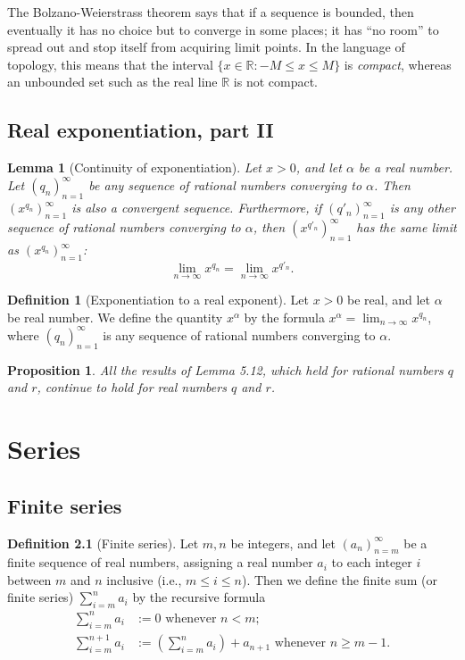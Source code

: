 \documentclass[
]{book}
\newtheorem{lemma}{Lemma}[chapter]
\newtheorem{proposition}{Proposition}[chapter]
\theoremstyle{definition}
\newtheorem{definition}{Definition}[chapter]
\theoremstyle{definition}
\theoremstyle{definition}
\theoremstyle{definition}
\theoremstyle{remark}
\begin{document}
The Bolzano-Weierstrass theorem says that if a sequence is bounded, then eventually it has no choice but to converge in some places; it has ``no room'' to spread out and stop itself from acquiring limit points. In the language of topology, this means that the interval \(\{x\in\mathbb{R}:-M\leq x\leq M\}\) is \emph{compact}, whereas an unbounded set such as the real line \(\mathbb{R}\) is not compact.

\section{Real exponentiation, part II}\label{real-exponentiation-part-ii}

\begin{lemma}[Continuity of exponentiation]
Let \(x>0\), and let \(\alpha\) be a real number. Let \((q_n)_{n=1}^{\infty}\) be any sequence of rational numbers converging to \(\alpha\). Then \((x^{q_n})_{n=1}^{\infty}\) is also a convergent sequence. Furthermore, if \((q'_n)_{n=1}^{\infty}\) is any other sequence of rational numbers converging to \(\alpha\), then \((x^{q'_n})_{n=1}^{\infty}\) has the same limit as \((x^{q_n})_{n=1}^{\infty}\):
\[
\lim_{n\to \infty} x^{q_n}=\lim_{n\to \infty} x^{q'_n}.
\]
\end{lemma}

\begin{definition}[Exponentiation to a real exponent]
Let \(x>0\) be real, and let \(\alpha\) be real number. We define the quantity \(x^{\alpha}\) by the formula \(x^\alpha = \lim_{n\to \infty} x^{q_n}\), where \((q_n)_{n=1}^{\infty}\) is any sequence of rational numbers converging to \(\alpha\).
\end{definition}

\begin{proposition}
All the results of Lemma 5.12, which held for rational numbers \(q\) and \(r\), continue to hold for real numbers \(q\) and \(r\).
\end{proposition}

\chapter{Series}\label{series}

\section{Finite series}\label{finite-series}

\begin{definition}[Finite series]
Let \(m,n\) be integers, and let \((a_n)_{n=m}^{\infty}\) be a finite sequence of real numbers, assigning a real number \(a_i\) to each integer \(i\) between \(m\) and \(n\) inclusive (i.e., \(m\leq i\leq n\)). Then we define the finite sum (or finite series) \(\sum_{i=m}^na_i\) by the recursive formula
\[
\begin{aligned}
\sum_{i=m}^na_i&:=0 \text{ whenever } n<m;\\
\sum_{i=m}^{n+1}a_i&:=\left(\sum_{i=m}^na_i\right)+a_{n+1}  \text{ whenever } n\geq m-1.
\end{aligned}
\]
\end{definition}
\end{document}
